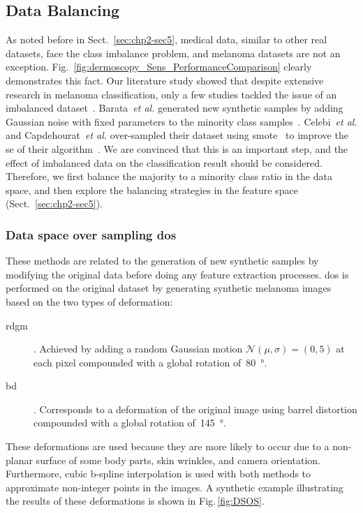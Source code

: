 \subsection{Data Balancing}\label{chp3-subsec5}
As noted before in Sect.~\ref{sec:chp2-sec5}, medical data, similar to other real datasets, face the class imbalance problem, and melanoma datasets are not an exception.
Fig.~\ref{fig:dermoscopy_Sens_PerformanceComparison} clearly demonstrates this fact.
Our literature study showed that despite extensive research in melanoma classification, only a few studies tackled the issue of an imbalanced dataset~\cite{barata2013two,celebi2007methodological}.
Barata~\emph{et al.} generated new synthetic samples by adding Gaussian noise with fixed parameters to the minority class samples~\cite{barata2013two}.
Celebi~\emph{et al.} and Capdehourat~\emph{et al.} over-sampled their dataset using \ac{smote}~\cite{chawla2002smote} to improve the \ac{se} of their algorithm~\cite{celebi2007methodological, capdehourat2009pigmented}.
We are convinced that this is an important step, and the effect of imbalanced data on the classification result should be considered.
Therefore, we first balance the majority to a minority class ratio in the data space, and then explore the balancing strategies in the feature space (Sect.~\ref{sec:chp2-sec5}).

\subsubsection{Data space over sampling \acs{dos}}
These methods are related to the generation of new synthetic samples by modifying the original data before doing any feature extraction processes. 
\Ac{dos} is performed on the original dataset by generating synthetic melanoma images based on the two types of deformation:
\begin{description}
	\item[\Ac{rdgm}]. Achieved by adding a random Gaussian motion $\mathcal{N}(\mu, \sigma) = (0,5)$ at each pixel compounded with a global rotation of~\SI{80}{\degree}.
	\item[\Ac{bd}]. Corresponds to a deformation of the original image using barrel distortion compounded with a global rotation of~\SI{145}{\degree}.
\end{description}
\noindent These deformations are used because they are more likely to occur due to a non-planar surface of some body parts, skin wrinkles, and camera orientation. 
Furthermore, cubic b-spline interpolation is used with both methods to approximate non-integer points in the images. 
A synthetic example illustrating the results of these deformations is shown in Fig.\,\ref{fig:DSOS}.

